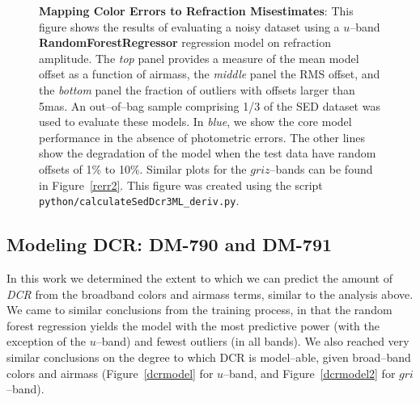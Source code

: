 \documentclass[DM,toc]{lsstdoc}
\begin{document}
\begin{figure}[!t]
    \centering
    \caption{\textbf{Mapping Color Errors to Refraction Misestimates}:
      This figure shows the results of evaluating a noisy dataset
      using a $u$--band \textbf{RandomForestRegressor} regression model
      on refraction amplitude.  The \textit{top} panel provides a measure
      of the mean model offset as a function of airmass, the
      \emph{middle} panel the RMS offset, and the \textit{bottom} panel the
      fraction of outliers with offsets larger than 5mas.  An
      out--of--bag sample comprising 1/3 of the SED dataset was used
      to evaluate these models.  In \textit{blue}, we show the core model
      performance in the absence of photometric errors.  The other
      lines show the degradation of the model when the test data have
      random offsets of 1\% to 10\%.  Similar plots for the
      $griz$--bands can be found in Figure~\ref{rerr2}.  This figure
      was created using the script
      \texttt{python/calculateSedDcr3ML\_deriv.py}.}
    \label{rerr}
\end{figure}

\subsection{Modeling DCR: DM-790 and DM-791}

In this work we determined the extent to which we can predict the
amount of \textit{DCR} from the broadband colors and airmass terms,
similar to the analysis above.  We came to similar conclusions from
the training process, in that the random forest regression yields the
model with the most predictive power (with the exception of the
$u$--band) and fewest outliers (in all bands).  We also reached very
similar conclusions on the degree to which DCR is model--able, given
broad--band colors and airmass (Figure~\ref{dcrmodel} for $u$--band,
and Figure~\ref{dcrmodel2} for $gri$--band).
\end{document}

